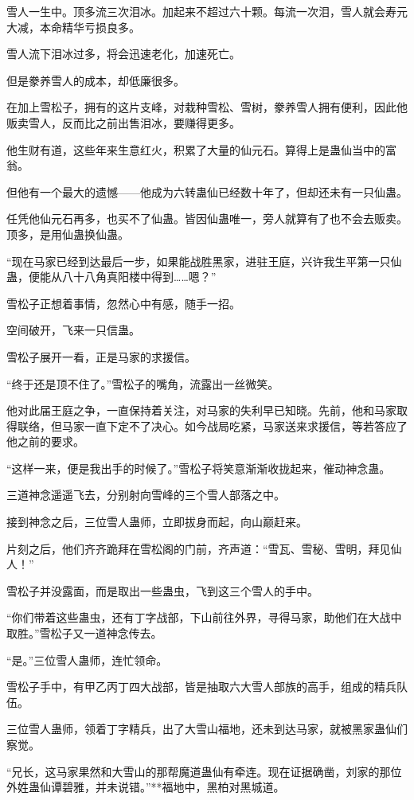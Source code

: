 \begin{this_body}
雪人一生中。顶多流三次泪冰。加起来不超过六十颗。每流一次泪，雪人就会寿元大减，本命精华亏损良多。

雪人流下泪冰过多，将会迅速老化，加速死亡。

但是豢养雪人的成本，却低廉很多。

在加上雪松子，拥有的这片支峰，对栽种雪松、雪树，豢养雪人拥有便利，因此他贩卖雪人，反而比之前出售泪冰，要赚得更多。

他生财有道，这些年来生意红火，积累了大量的仙元石。算得上是蛊仙当中的富翁。

但他有一个最大的遗憾——他成为六转蛊仙已经数十年了，但却还未有一只仙蛊。

任凭他仙元石再多，也买不了仙蛊。皆因仙蛊唯一，旁人就算有了也不会去贩卖。顶多，是用仙蛊换仙蛊。

“现在马家已经到达最后一步，如果能战胜黑家，进驻王庭，兴许我生平第一只仙蛊，便能从八十八角真阳楼中得到……嗯？”

雪松子正想着事情，忽然心中有感，随手一招。

空间破开，飞来一只信蛊。

雪松子展开一看，正是马家的求援信。

“终于还是顶不住了。”雪松子的嘴角，流露出一丝微笑。

他对此届王庭之争，一直保持着关注，对马家的失利早已知晓。先前，他和马家取得联络，但马家一直下定不了决心。如今战局吃紧，马家送来求援信，等若答应了他之前的要求。

“这样一来，便是我出手的时候了。”雪松子将笑意渐渐收拢起来，催动神念蛊。

三道神念遥遥飞去，分别射向雪峰的三个雪人部落之中。

接到神念之后，三位雪人蛊师，立即拔身而起，向山巅赶来。

片刻之后，他们齐齐跪拜在雪松阁的门前，齐声道：“雪瓦、雪秘、雪明，拜见仙人！”

雪松子并没露面，而是取出一些蛊虫，飞到这三个雪人的手中。

“你们带着这些蛊虫，还有丁字战部，下山前往外界，寻得马家，助他们在大战中取胜。”雪松子又一道神念传去。

“是。”三位雪人蛊师，连忙领命。

雪松子手中，有甲乙丙丁四大战部，皆是抽取六大雪人部族的高手，组成的精兵队伍。

三位雪人蛊师，领着丁字精兵，出了大雪山福地，还未到达马家，就被黑家蛊仙们察觉。

“兄长，这马家果然和大雪山的那帮魔道蛊仙有牵连。现在证据确凿，刘家的那位外姓蛊仙谭碧雅，并未说错。”**福地中，黑柏对黑城道。


\end{this_body}
